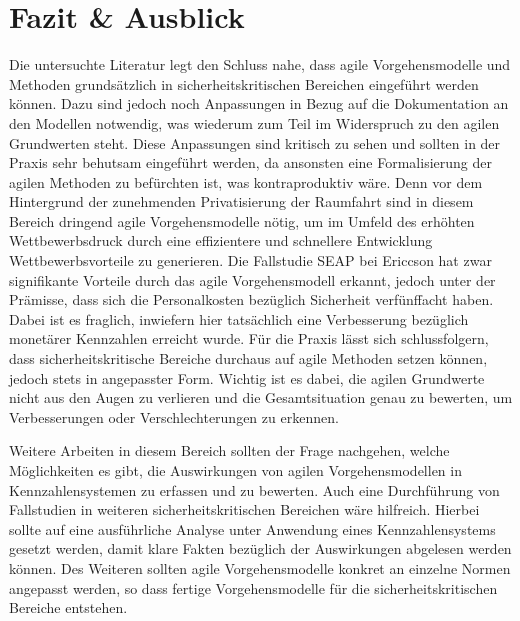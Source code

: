 \section{Fazit \& Ausblick}

\begin{comment}
++++++++++++
Zudem sollte der Schlussteil immer eine Interpretation und Bewertung der Forschungsergebnisse enthalten: Was leisten die Ergebnisse? Haben sich durch Ihre Hausarbeit (Forschungs-)Fragen ergeben, die noch geklärt werden müssen (sog. Ausblick)?

Stand der Dinge in Sachen DevOps? Kann es sich durchsetzen und halten?



Schlussfolgerungen.

Handlungsempfehlungen für die Praxis!
++++++++++++
\end{comment}



Die untersuchte Literatur legt den Schluss nahe, dass agile Vorgehensmodelle und Methoden grundsätzlich in sicherheitskritischen Bereichen eingeführt werden können.
Dazu sind jedoch noch Anpassungen in Bezug auf die Dokumentation an den Modellen notwendig, was wiederum zum Teil im Widerspruch zu den agilen Grundwerten steht.
Diese Anpassungen sind kritisch zu sehen und sollten in der Praxis sehr behutsam eingeführt werden, da ansonsten eine Formalisierung der agilen Methoden zu befürchten ist, was kontraproduktiv wäre.
Denn vor dem Hintergrund der zunehmenden Privatisierung der Raumfahrt sind in diesem Bereich dringend agile Vorgehensmodelle nötig, um im Umfeld des erhöhten Wettbewerbsdruck durch eine effizientere und schnellere Entwicklung Wettbewerbsvorteile zu generieren.
Die Fallstudie SEAP bei Ericcson hat zwar signifikante Vorteile durch das agile Vorgehensmodell erkannt, jedoch unter der Prämisse, dass sich die Personalkosten bezüglich Sicherheit verfünffacht haben.
Dabei ist es fraglich, inwiefern hier tatsächlich eine Verbesserung bezüglich monetärer Kennzahlen erreicht wurde.
Für die Praxis lässt sich schlussfolgern, dass sicherheitskritische Bereiche durchaus auf agile Methoden setzen können, jedoch stets in angepasster Form.
Wichtig ist es dabei, die agilen Grundwerte nicht aus den Augen zu verlieren und die Gesamtsituation genau zu bewerten, um Verbesserungen oder Verschlechterungen zu erkennen.

Weitere Arbeiten in diesem Bereich sollten der Frage nachgehen, welche Möglichkeiten es gibt, die Auswirkungen von agilen Vorgehensmodellen in Kennzahlensystemen zu erfassen und zu bewerten.
Auch eine Durchführung von Fallstudien in weiteren sicherheitskritischen Bereichen wäre hilfreich. 
Hierbei sollte auf eine ausführliche Analyse unter Anwendung eines Kennzahlensystems gesetzt werden, damit klare Fakten bezüglich der Auswirkungen abgelesen werden können.
Des Weiteren sollten agile Vorgehensmodelle konkret an einzelne Normen angepasst werden, so dass fertige Vorgehensmodelle für die sicherheitskritischen Bereiche entstehen.


